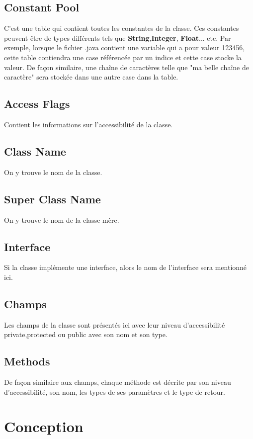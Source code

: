\documentclass[12pt, a4paper, one side]{article}
\begin{document}
    \subsection{Constant Pool}
    C'est une table qui contient toutes les constantes de la classe. Ces constantes peuvent être de types différents tels que \textbf{String},\textbf{Integer}, \textbf{Float}... etc. Par exemple, lorsque le fichier .java contient une variable qui a pour valeur 123456, cette table contiendra une case référencée par un indice et cette case stocke la valeur. De façon similaire, une chaîne de caractères telle que "ma belle chaîne de caractère" sera stockée dans une autre case dans la table.

    \subsection{Access Flags}
    Contient les informations sur l'accessibilité de la classe.

    \subsection{Class Name}
    On y trouve le nom de la classe.
    \subsection{Super Class Name}
    On y trouve le nom de la classe mère.

    \subsection{Interface}
    Si la classe implémente une interface, alors le nom de l'interface sera mentionné ici.

    \subsection{Champs}
    Les champs de la classe sont présentés ici avec leur niveau d'accessibilité private,protected ou public avec son nom et son type.

    \subsection{Methods}
    De façon similaire aux champs, chaque méthode est décrite par son niveau d'accessibilité, son nom, les types de ses paramètres et le type de retour.


    \section{Conception}
\end{document}
